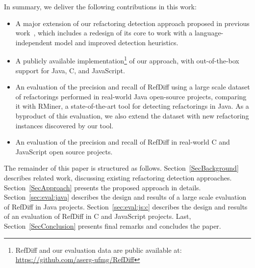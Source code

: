In summary, we deliver the following contributions in this work:
\begin{itemize}
\item A major extension of our refactoring detection approach proposed in previous work~\cite{msr2017}, which includes a redesign of its core to work with a language-independent model and improved detection heuristics.
\item A publicly available implementation\footnote{RefDiff and our evaluation data are public available at:\\
\url{https://github.com/aserg-ufmg/RefDiff}}
of our approach, with out-of-the-box support for Java, C, and JavaScript.
\item An evaluation of the precision and recall of RefDiff using a large scale dataset of refactorings performed in real-world Java open-source projects, comparing it with RMiner, a state-of-the-art tool for detecting refactorings in Java. As a byproduct of this evaluation, we also extend the dataset with new refactoring instances discovered by our tool.
\item An evaluation of the precision and recall of RefDiff in real-world C and JavaScript open source projects.
\end{itemize}

The remainder of this paper is structured as follows.
Section~\ref{SecBackground} describes related work, discussing existing refactoring detection approaches.
Section~\ref{SecApproach} presents the proposed approach in details.
Section~\ref{sec:eval:java} describes the design and results of a large scale evaluation of RefDiff in Java projects.
Section~\ref{sec:eval:js:c} describes the design and results of an evaluation of RefDiff in C and JavaScript projects.
Last, Section~\ref{SecConclusion} presents final remarks and concludes the paper.
